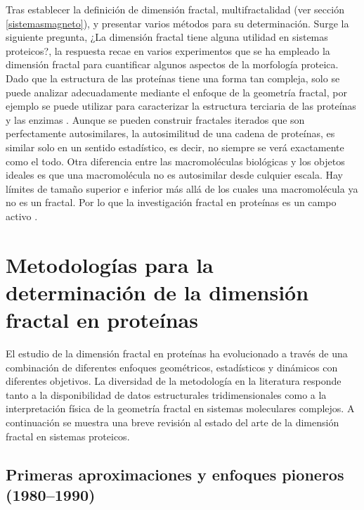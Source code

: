 Tras establecer la definición de dimensión fractal, multifractalidad (ver sección \ref*{sistemasmagneto}), y presentar varios métodos para su determinación. Surge la siguiente pregunta, ¿La dimensi\'{o}n fractal tiene alguna utilidad en sistemas proteicos?, la respuesta recae en varios experimentos que se ha empleado la dimensión fractal para cuantificar algunos aspectos de la morfolog\'{i}a proteica. Dado que la estructura de las prote\'{i}nas tiene una forma tan compleja, solo se puede analizar adecuadamente mediante el enfoque de la geometr\'{i}a fractal, por ejemplo se puede utilizar para caracterizar la estructura terciaria de las prote\'{i}nas y las enzimas \cite{Mustafa1996}. Aunque se pueden construir fractales iterados que son perfectamente autosimilares, la autosimilitud de una cadena de prote\'{i}nas, es similar solo en un sentido estad\'{i}stico, es decir, no siempre se ver\'{a} exactamente como el todo. Otra diferencia entre las macromol\'{e}culas biol\'{o}gicas y los objetos ideales es que una macromol\'{e}cula no es autosimilar desde culquier escala. Hay l\'{i}mites de tamaño superior e inferior m\'{a}s all\'{a} de los cuales una macromol\'{e}cula ya no es un fractal. Por lo que la investigaci\'{o}n fractal en prote\'{i}nas es un campo activo \cite{Mustafa1996}. 

\section{Metodolog\'{i}as para la determinaci\'{o}n de la dimensi\'{o}n fractal en prote\'{i}nas}

El estudio de la dimensi\'{o}n fractal en prote\'{i}nas ha evolucionado a trav\'{e}s de una combinaci\'{o}n de diferentes enfoques geom\'{e}tricos, estad\'{i}sticos y din\'{a}micos con diferentes objetivos. La diversidad de la metodolog\'{i}a en la literatura responde tanto a la disponibilidad de datos estructurales tridimensionales como a la interpretaci\'{o}n f\'{i}sica de la geometr\'{i}a fractal en sistemas moleculares complejos. A continuaci\'{o}n se muestra una breve revisi\'{o}n al estado del arte de la dimensi\'{o}n fractal en sistemas proteicos.

\subsection{Primeras aproximaciones y enfoques pioneros (1980--1990)}

